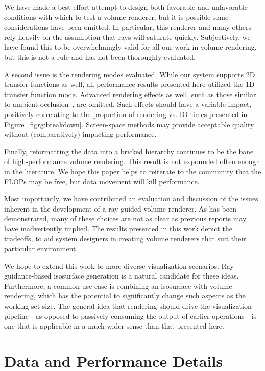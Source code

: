 We have made a best-effort attempt to design both favorable and
unfavorable conditions with which to test a volume renderer, but it
is possible some considerations have been omitted.  In particular,
this renderer and many others rely heavily on the assumption that
rays will saturate quickly.  Subjectively, we have found this to be
overwhelmingly valid for all our work in volume rendering, but this is
not a rule and has not been thoroughly evaluated.

A second issue is the rendering modes evaluated.  While our system
supports 2D transfer functions as well, all performance results
presented here utilized the 1D transfer function mode.  Advanced
rendering effects as well, such as those similar to ambient
occlusion~\cite{Schott:2009:DAOVR}, are omitted.  Such effects should
have a variable impact, positively correlating to the proportion of
rendering vs. IO times presented in
Figure~\ref{figrg:breakdown}.  Screen-space methods may provide
acceptable quality without (comparatively) impacting performance.

Finally, reformatting the data into a bricked hierarchy continues to
be the bane of high-performance volume rendering.  This result is not
expounded often enough in the literature.  We hope this paper helps
to reiterate to the community that the FLOPs may be free, but data
movement will kill performance.

Most importantly, we have contributed an evaluation and discussion
of the issues inherent in the development of a ray guided volume
renderer. As has been demonstrated, many of these choices are not as
clear as previous reports may have inadvertently implied.  The results
presented in this work depict the tradeoffs, to aid system designers in
creating volume renderers that suit their particular environment.

We hope to extend this work to more diverse visualization scenarios.
Ray-guidance-based isosurface generation is a natural candidate for
these ideas.  Furthermore, a common use case is combining an isosurface
with volume rendering, which has the potential to significantly change
such aspects as the working set size.  The general idea that rendering
should drive the visualization pipeline---as opposed to passively
consuming the output of earlier operations---is one that is applicable
in a much wider sense than that presented here.

\section{Data and Performance Details}
\label{sec:data}

